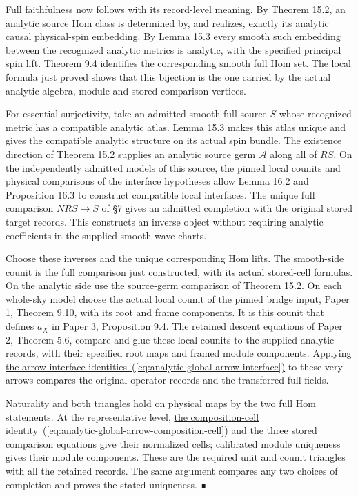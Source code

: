 \documentclass[
  english,
  11pt,
  reqno]{amsart}
\begin{document}
Full faithfulness now follows with its record-level meaning. By Theorem
15.2, an analytic source Hom class is determined by, and realizes,
exactly its analytic causal physical-spin embedding. By Lemma 15.3 every
smooth such embedding between the recognized analytic metrics is
analytic, with the specified principal spin lift. Theorem 9.4 identifies
the corresponding smooth full Hom set. The local formula just proved
shows that this bijection is the one carried by the actual analytic
algebra, module and stored comparison vertices.

For essential surjectivity, take an admitted smooth full source \(S\)
whose recognized metric has a compatible analytic atlas. Lemma 15.3
makes this atlas unique and gives the compatible analytic structure on
its actual spin bundle. The existence direction of Theorem 15.2 supplies
an analytic source germ \(\mathcal A\) along all of \(RS\). On the
independently admitted models of this source, the pinned local counits
and physical comparisons of the interface hypotheses allow Lemma 16.2
and Proposition 16.3 to construct compatible local interfaces. The
unique full comparison \(NRS\to S\) of §7 gives an admitted completion
with the original stored target records. This constructs an inverse
object without requiring analytic coefficients in the supplied smooth
wave charts.

Choose these inverses and the unique corresponding Hom lifts. The
smooth-side counit is the full comparison just constructed, with its
actual stored-cell formulas. On the analytic side use the source-germ
comparison of Theorem 15.2. On each whole-sky model choose the actual
local counit of the pinned bridge input, Paper 1, Theorem 9.10, with its
root and frame components. It is this counit that defines \(a_X\) in
Paper 3, Proposition 9.4. The retained descent equations of Paper 2,
Theorem 5.6, compare and glue these local counits to the supplied
analytic records, with their specified root maps and framed module
components. Applying \hyperref[eq:analytic-global-arrow-interface]{the
arrow interface identities~(\ref*{eq:analytic-global-arrow-interface})} to these very arrows compares the original
operator records and the transferred full fields.

Naturality and both triangles hold on physical maps by the two full Hom
statements. At the representative level,
\hyperref[eq:analytic-global-arrow-composition-cell]{the
composition-cell identity~(\ref*{eq:analytic-global-arrow-composition-cell})} and the three stored comparison equations
give their normalized cells; calibrated module uniqueness gives their
module components. These are the required unit and counit triangles with
all the retained records. The same argument compares any two choices of
completion and proves the stated uniqueness. ∎
\end{document}
